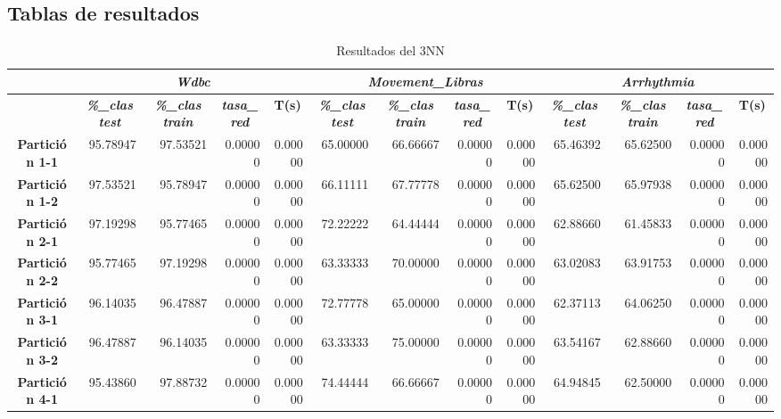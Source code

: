 \documentclass[a4paper,11pt]{article}
\begin{document}
 \subsection{Tablas de resultados}
 \begin{table}[H]	
    \caption{Resultados del 3NN}
    \begin{adjustbox}{width=1.1\textwidth}
    \begin{tabular}{|c|r|r|r|r|r|r|r|r|r|r|r|r|}
    \hline
    \multicolumn{1}{|l|}{} & \multicolumn{ 4}{c|}{\textbf{\textit{Wdbc}}} & \multicolumn{ 4}{c|}{\textbf{\textit{Movement\_Libras}}} & \multicolumn{ 4}{c|}{\textbf{\textit{Arrhythmia}}} \\ \hline
    & \multicolumn{1}{c|}{\textbf{\textit{\%\_clas test}}} & \multicolumn{1}{c|}{\textbf{\textit{\%\_clas train}}} & \multicolumn{1}{c|}{\textbf{\textit{tasa\_red}}} & \multicolumn{1}{c|}{\textbf{T(s)}} & \multicolumn{1}{c|}{\textbf{\textit{\%\_clas test}}} & \multicolumn{1}{c|}{\textbf{\textit{\%\_clas train}}} & \multicolumn{1}{c|}{\textbf{\textit{tasa\_red}}} & \multicolumn{1}{c|}{\textbf{T(s)}} & \multicolumn{1}{c|}{\textbf{\textit{\%\_clas test}}} & \multicolumn{1}{c|}{\textbf{\textit{\%\_clas train}}} & \multicolumn{1}{c|}{\textbf{\textit{tasa\_red}}} & \multicolumn{1}{c|}{\textbf{T(s)}} \\ \hline
    \textbf{Partición 1-1} & 95.78947 & 97.53521 & 0.00000 & 0.00000 & 65.00000 & 66.66667 & 0.00000 & 0.00000 & 65.46392 & 65.62500 & 0.00000 & 0.00000 \\ \hline
    \textbf{Partición 1-2} & 97.53521 & 95.78947 & 0.00000 & 0.00000 & 66.11111 & 67.77778 & 0.00000 & 0.00000 & 65.62500 & 65.97938 & 0.00000 & 0.00000 \\ \hline
    \textbf{Partición 2-1} & 97.19298 & 95.77465 & 0.00000 & 0.00000 & 72.22222 & 64.44444 & 0.00000 & 0.00000 & 62.88660 & 61.45833 & 0.00000 & 0.00000 \\ \hline
    \textbf{Partición 2-2} & 95.77465 & 97.19298 & 0.00000 & 0.00000 & 63.33333 & 70.00000 & 0.00000 & 0.00000 & 63.02083 & 63.91753 & 0.00000 & 0.00000 \\ \hline
    \textbf{Partición 3-1} & 96.14035 & 96.47887 & 0.00000 & 0.00000 & 72.77778 & 65.00000 & 0.00000 & 0.00000 & 62.37113 & 64.06250 & 0.00000 & 0.00000 \\ \hline
    \textbf{Partición 3-2} & 96.47887 & 96.14035 & 0.00000 & 0.00000 & 63.33333 & 75.00000 & 0.00000 & 0.00000 & 63.54167 & 62.88660 & 0.00000 & 0.00000 \\ \hline
    \textbf{Partición 4-1} & 95.43860 & 97.88732 & 0.00000 & 0.00000 & 74.44444 & 66.66667 & 0.00000 & 0.00000 & 64.94845 & 62.50000 & 0.00000 & 0.00000 \\ \hline

\end{tabular}
\end{adjustbox}
\end{table}
\end{document}
